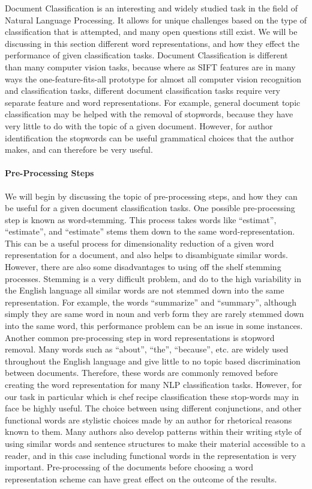 \documentclass[paper=a4, fontsize=11pt]{scrartcl} %
\begin{document}
Document Classification is an interesting and widely studied task in the field of Natural Language Processing.  
It allows for unique challenges based on the type of classification that is attempted, and many open questions still exist.   
We will be discussing in this section different word representations, and how they effect the performance of given classification tasks.  
Document Classification is different than many computer vision tasks, because where as SIFT features are in many ways the one-feature-fits-all prototype for almost all computer vision recognition and classification tasks, different document classification tasks require very separate feature and word representations.  
For example, general document topic classification may be helped with the removal of stopwords, because they have very little to do with the topic of a given document.  
However, for author identification the stopwords can be useful grammatical choices that the author makes, and can therefore be very useful.  

\paragraph{Pre-Processing Steps}
We will begin by discussing the topic of pre-processing steps, and how they can be useful for a given document classification tasks.  
One possible pre-processing step is known as word-stemming.  
This process takes words like ``estimat'', ``estimate'', and ``estimate'' stems them down to the same word-representation.  
This can be a useful process for dimensionality reduction of a given word representation for a document, and also helps to disambiguate similar words.  
However, there are also some disadvantages to using off the shelf stemming processes.  Stemming is a very difficult problem, and do to the high variability in the English language all similar words are not stemmed down into the same representation.  
For example, the words ``summarize'' and ``summary'', although simply they are same word in noun and verb form they are rarely stemmed down into the same word, this performance problem can be an issue in some instances.  
Another common pre-processing step in word representations is stopword removal.  Many words such as ``about'', ``the'', ``because'', etc. are widely used throughout the English language and give little to no topic based discrimination between documents.  
Therefore, these words are commonly removed before creating the word representation for many NLP classification tasks.  However, for our task in particular which is chef recipe classification these stop-words may in face be highly useful.  
The choice between using different conjunctions, and other functional words are stylistic choices made by an author for rhetorical reasons known to them.  
Many authors also develop patterns within their writing style of using similar words and sentence structures to make their material accessible to a reader, and in this case including functional words in the representation is very important.  
Pre-processing of the documents before choosing a word representation scheme can have great effect on the outcome of the results.
\end{document}

